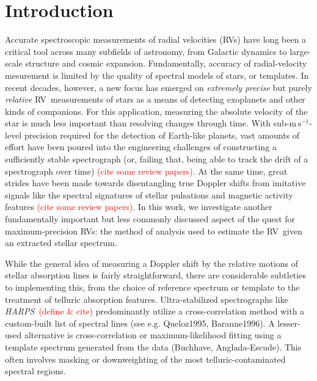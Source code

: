 \documentclass[modern]{aastex61}
\newcommand{\unit}[1]{\mathrm{#1}}
\newcommand{\m}{\unit{m}}
\newcommand{\s}{\unit{s}}
\newcommand{\ms}{\m\,\s^{-1}}
\newcommand{\todo}[1]{\textcolor{red}{#1}}  %
\newcommand{\acronym}[1]{{\small{#1}}}
\newcommand{\project}[1]{\textsl{#1}}
\newcommand{\HARPS}{\project{\acronym{HARPS}}}
\newcommand{\RV}{\acronym{RV}}
\begin{document}

\section{Introduction}


Accurate spectroscopic measurements of radial velocities (\RV s) have long been a critical tool across many subfields of astronomy, from Galactic dynamics to large-scale structure and cosmic expansion.
Fundamentally, accuracy of radial-velocity mesurement is limited by the quality of spectral models of stars, or templates.
In recent decades, however, a new focus has emerged on \emph{extremely precise} but purely \emph{relative} \RV\ measurements of stars as a means of detecting exoplanets and other kinds of companions.
For this application, measuring the absolute velocity of the star is much less important than resolving changes through time.
With sub-$\ms$-level precision required for the detection of Earth-like planets, vast amounts of effort have been poured into the engineering challenges of constructing a sufficiently stable spectrograph (or, failing that, being able to track the drift of a spectrograph over time) \todo{(cite some review papers)}. At the same time, great strides have been made towards disentangling true Doppler shifts from imitative signals like the spectral signatures of stellar pulsations and magnetic activity features \todo{(cite some review papers)}.  In this work, we investigate another fundamentally important but less commonly discussed aspect of the quest for maximum-precision \RV s: the method of analysis used to estimate the \RV\ given an extracted stellar spectrum.

While the general idea of measuring a Doppler shift by the relative motions of stellar absorption lines is fairly straightforward, there are considerable subtleties to implementing this, from the choice of reference spectrum or template to the treatment of telluric absorption features. Ultra-stabilized spectrographs like \HARPS\ \todo{(define \& cite)} predominantly utilize a cross-correlation method with a custom-built list of spectral lines (see e.g. Queloz1995, Baranne1996). 
A lesser-used alternative is cross-correlation or maximum-likelihood fitting using a template spectrum generated from the data (Buchhave, Anglada-Escude). 
This often involves masking or downweighting of the most telluric-contaminated spectral regions.
\end{document}
